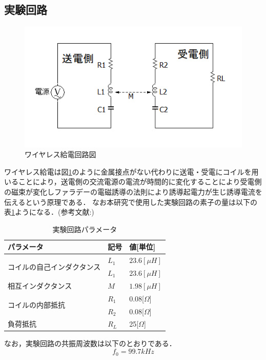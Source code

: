 \documentclass[10pt,a4paper,twocolumn]{jarticle}
\begin{document}
\subsection{実験回路}
\begin{figure}[h]
	\centering
	\includegraphics[scale=0.6]{wpt_2020128.png}
	\caption{ワイヤレス給電回路図}
	\label{fig:wpt_kairo}
\end{figure}
ワイヤレス給電は図\ref{fig:wpt_kairo}のように金属接点がない代わりに送電・受電にコイルを用いることにより，送電側の交流電源の電流が時間的に変化することにより受電側の磁束が変化しファラデーの電磁誘導の法則により誘導起電力が生じ誘導電流を伝えるという原理である．
なお本研究で使用した実験回路の素子の量は以下の表\ref{tab:para}ようになる．(参考文献:\cite{goizuka})
\begin{table}[h]
	\centering
	\caption{実験回路パラメータ}
	\label{tab:para}
	\begin{tabular}{|l|l|l|}
		\hline
		パラメータ                          & 記号    & 値{[}単位{]}          \\ \hline
		\multirow{2}{*}{コイルの自己インダクタンス} & $L_1$ & $23.6[\mu H]$      \\ \cline{2-3} 
		& $L_1$ & $23.6[\mu H]$      \\ \hline
		相互インダクタンス                      & $M$   & $1.98[\mu H]$      \\ \hline
		\multirow{2}{*}{コイルの内部抵抗}      & $R_1$ & 0.08{[}$\Omega${]}  \\ \cline{2-3} 
		& $R_2$ & 0.08{[}$\Omega${]} \\ \hline
		負荷抵抗                           & $R_L$ & 25{[}$\Omega${]}   \\ \hline
	\end{tabular}
\end{table}
なお，実験回路の共振周波数は以下のとおりである．
\begin{equation}
f_0=99.7kHz \nonumber
\end{equation}
\end{document}
